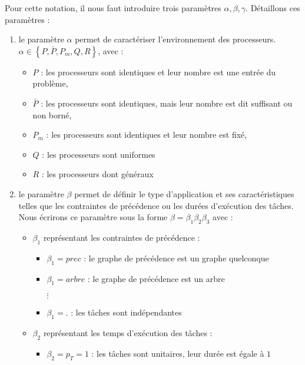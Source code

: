 Pour cette notation, il nous faut introduire trois paramètres $\alpha, \beta, \gamma$. Détaillons
ces paramètres :
\begin{enumerate}
    \item le paramètre $\alpha$ permet de caractériser l'environnement des processeurs. \\
        $\alpha \in \left\{ P, \bar{P}, P_m, Q, R \right\}$, avec :
        \begin{itemize}
            \item $P$ : les processeurs sont identiques et leur nombre est une entrée du problème,
            \item $\bar{P}$ : les processeurs sont identiques, mais leur nombre est dit suffisant ou
                non borné,
            \item $P_m$ : les processeurs sont identiques et leur nombre est fixé,
            \item $Q$ : les processeurs sont uniformes
            \item $R$ : les processeurs dont généraux
        \end{itemize}
    \item le paramètre $\beta$ permet de définir le type d'application et ses caractéristiques
        telles que les contraintes de précédence ou les durées d'exécution des tâches. Nous écrirons
        ce paramètre sous la forme $\beta = \beta_1\beta_2\beta_3$ avec :
        \begin{itemize}[label=$\bullet$]
            \item $\beta_1$ représentant les contraintes de précédence :
                \begin{itemize}
                    \item $\beta_1 = prec$ : le graphe de précédence est un graphe quelconque
                    \item $\beta_1 = arbre$ : le graphe de précédence est un arbre
                    \item[$\vdots$]
                    \item $\beta_1 = .$ : les tâches sont indépendantes
                \end{itemize}
            \item $\beta_2$ représentant les temps d'exécution des tâches :
                \begin{itemize}
                    \item $\beta_2 = p_T = 1$ : les tâches sont unitaires, leur durée est égale à
                        $1$

\end{itemize}
\end{itemize}
\end{enumerate}
